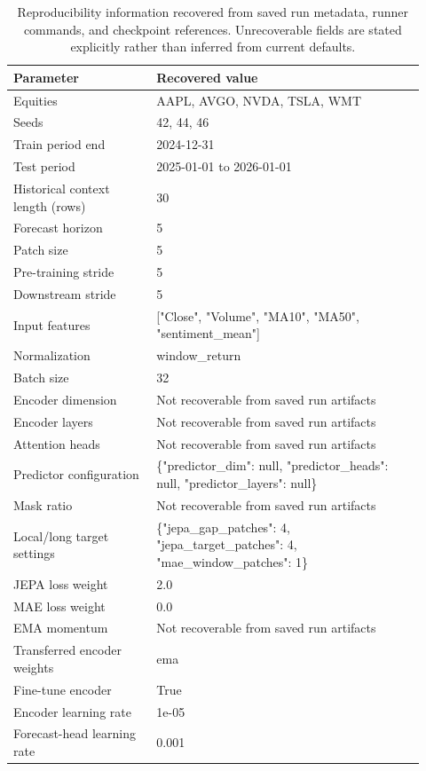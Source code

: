 \begin{table}[p]
\centering
\small
\caption{Reproducibility information recovered from saved run metadata, runner commands, and checkpoint references. Unrecoverable fields are stated explicitly rather than inferred from current defaults.}
\label{tab:reproducibility}
\begin{tabular}{p{0.32\linewidth}p{0.60\linewidth}}
\toprule
Parameter & Recovered value \\
\midrule
Equities & AAPL, AVGO, NVDA, TSLA, WMT \\
Seeds & 42, 44, 46 \\
Train period end & 2024-12-31 \\
Test period & 2025-01-01 to 2026-01-01 \\
Historical context length (rows) & 30 \\
Forecast horizon & 5 \\
Patch size & 5 \\
Pre-training stride & 5 \\
Downstream stride & 5 \\
Input features & ["Close", "Volume", "MA10", "MA50", "sentiment\_mean"] \\
Normalization & window\_return \\
Batch size & 32 \\
Encoder dimension & Not recoverable from saved run artifacts \\
Encoder layers & Not recoverable from saved run artifacts \\
Attention heads & Not recoverable from saved run artifacts \\
Predictor configuration & \{"predictor\_dim": null, "predictor\_heads": null, "predictor\_layers": null\} \\
Mask ratio & Not recoverable from saved run artifacts \\
Local/long target settings & \{"jepa\_gap\_patches": 4, "jepa\_target\_patches": 4, "mae\_window\_patches": 1\} \\
JEPA loss weight & 2.0 \\
MAE loss weight & 0.0 \\
EMA momentum & Not recoverable from saved run artifacts \\
Transferred encoder weights & ema \\
Fine-tune encoder & True \\
Encoder learning rate & 1e-05 \\
Forecast-head learning rate & 0.001 \\

\end{tabular}
\end{table}
